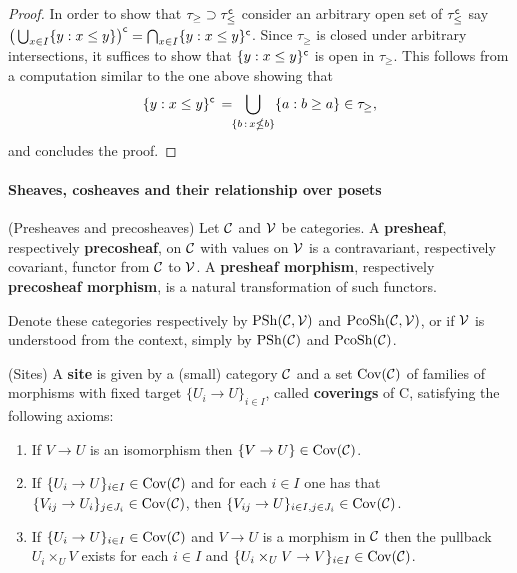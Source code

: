 \documentclass[main.tex]{subfiles}
\begin{document}
\begin{lemma}
\begin{proof}
In order to show that $\tau_\geq\supset\tau_{\leq}^{\mathsf{c}}$ consider an arbitrary open set of $\tau_{\leq}^{\mathsf{c}}$ say $\big(\bigcup_{x\in I}\{y:x\leq y\}\big)^{\mathsf{c}}=\bigcap_{x\in I}\{y:x\leq y\}^{\mathsf{c}}$. Since $\tau_\geq$ is closed under arbitrary intersections, it suffices to show that $\{y:x\leq y\}^{\mathsf{c}}$ is open in $\tau_\geq$. This follows from a computation similar to the one above showing that
\begin{equation*}
\{y:x\leq y\}^\c\,=\!\!\bigcup_{\{b\,:\,x\nleq b\}}\{a:b\geq a\}\in\tau_\geq, \vspace*{-8pt}
\end{equation*}
and concludes the proof.
\end{proof}
\end{lemma}

\paragraph{Sheaves, cosheaves and their relationship over posets}

\begin{defn}(Presheaves and precosheaves)
Let $\operatorname{\mathcal{C}}$ and $\operatorname{\mathcal{V}}$ be categories. A \textbf{presheaf}, respectively \textbf{precosheaf}, on $\operatorname{\mathcal{C}}$ with values on $\operatorname{\mathcal{V}}$ is a
contravariant, respectively covariant, functor from $\operatorname{\mathcal{C}}$ to $\operatorname{\mathcal{V}}$. A \textbf{presheaf morphism}, respectively \textbf{precosheaf morphism}, is a natural transformation of such functors.

Denote these categories respectively by $\operatorname{PSh}(\operatorname{\mathcal{C}},\operatorname{\mathcal{V}})$ and $\operatorname{PcoSh}(\operatorname{\mathcal{C}},\operatorname{\mathcal{V}})$, or if $\operatorname{\mathcal{V}}$ is understood from the context, simply by $\operatorname{PSh}(\operatorname{\mathcal{C}})$ and $\operatorname{PcoSh}(\operatorname{\mathcal{C}})$.
\end{defn}

\begin{defn}(Sites)
A \textbf{site} is given by a (small) category $\operatorname{\mathcal{C}}$ and a set $\operatorname{Cov}(\operatorname{\mathcal{C}})$ of families of
morphisms with fixed target $\{U_i\to U\}_{i\in I}$, called \textbf{coverings} of C, satisfying the
following axioms:
\begin{enumerate}[S1:]
\item If $V\to U$ is an isomorphism then $\{V\to U\}\in\operatorname{Cov}(\operatorname{\mathcal{C}})$.
\item If $\{U_i\to U\}_{i\in I}\in\operatorname{Cov}(\operatorname{\mathcal{C}})$ and for each $i\in I$ one has that $\{V_{ij}\to U_i\}_{j\in J_i}\in\operatorname{Cov}(\operatorname{\mathcal{C}})$,
    then $\{V_{ij}\to U\}_{i\in I, j\in J_i}\in\operatorname{Cov}(\operatorname{\mathcal{C}})$.
\item If $\{U_i\to U\}_{i\in I}\in\operatorname{Cov}(\operatorname{\mathcal{C}})$ and $V\to U$ is a morphism in $\operatorname{\mathcal{C}}$ then the pullback $U_i\times_U V$ exists for each $i\in I$ and $\{U_i\times_U V\to V\}_{i\in I}\in\operatorname{Cov}(\operatorname{\mathcal{C}})$.
\end{enumerate}
\end{defn}
\end{document}

